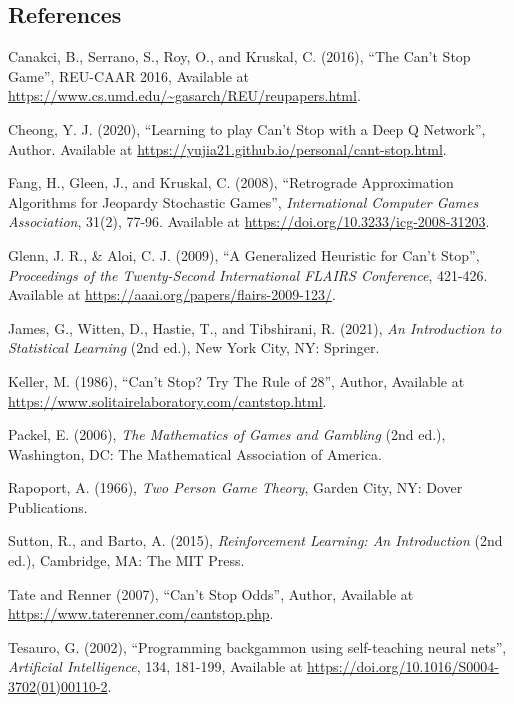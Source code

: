 \documentclass[12pt]{article}
\begin{document}
\begin{thesis}
\newpage

\section*{References}\label{references}


\noindent Canakci, B., Serrano, S., Roy, O., and Kruskal, C. (2016), ``The Can't Stop Game'', REU-CAAR 2016, Available at \url{https://www.cs.umd.edu/~gasarch/REU/reupapers.html}.

\noindent Cheong, Y. J. (2020), ``Learning to play Can't Stop with a Deep Q Network'', Author. Available at \url{https://yujia21.github.io/personal/cant-stop.html}.

\noindent Fang, H., Gleen, J., and Kruskal, C. (2008), ``Retrograde Approximation Algorithms for Jeopardy Stochastic Games'', \emph{International Computer Games Association}, 31(2), 77-96. Available at \url{https://doi.org/10.3233/icg-2008-31203}.

\noindent Glenn, J. R., \& Aloi, C. J. (2009), ``A Generalized Heuristic for Can't Stop'', \emph{Proceedings of the Twenty-Second International FLAIRS Conference}, 421-426. Available at \url{https://aaai.org/papers/flairs-2009-123/}.

\noindent James, G., Witten, D., Hastie, T., and Tibshirani, R. (2021), \emph{An Introduction to Statistical Learning} (2nd ed.), New York City, NY: Springer.

\noindent Keller, M. (1986), ``Can't Stop? Try The Rule of 28'', Author, Available at \url{https://www.solitairelaboratory.com/cantstop.html}.

\noindent Packel, E. (2006), \emph{The Mathematics of Games and Gambling} (2nd ed.), Washington, DC: The Mathematical Association of America.

\noindent Rapoport, A. (1966), \emph{Two Person Game Theory}, Garden City, NY: Dover Publications.

\noindent Sutton, R., and Barto, A. (2015), \emph{Reinforcement Learning: An Introduction} (2nd ed.), Cambridge, MA: The MIT Press.

\noindent Tate and Renner (2007), ``Can't Stop Odds'', Author, Available at \url{https://www.taterenner.com/cantstop.php}.

\noindent Tesauro, G. (2002), ``Programming backgammon using self-teaching neural nets'', \emph{Artificial Intelligence}, 134, 181-199, Available at \url{https://doi.org/10.1016/S0004-3702(01)00110-2}.


\end{thesis}
\end{document}
